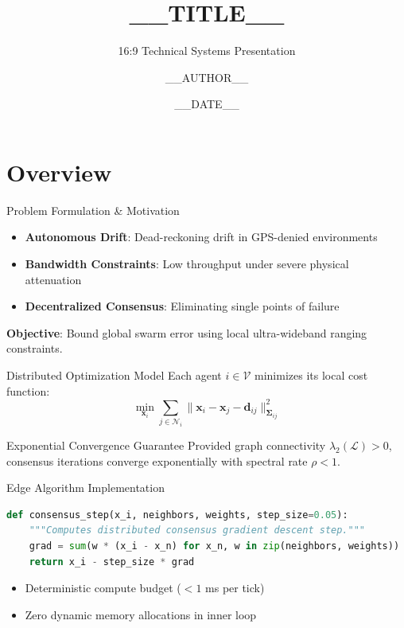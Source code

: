 \documentclass[aspectratio=169, 11pt]{beamer}
\title{\textbf{__TITLE__}}
\subtitle{16:9 Technical Systems Presentation}
\author{__AUTHOR__}
\institute{__DEPENDENCY__}
\date{__DATE__}
\begin{document}
\begin{frame}[plain]
    \titlepage
\end{frame}

\section{Overview}

\begin{frame}{Problem Formulation \& Motivation}
    \begin{itemize}
        \item \textbf{Autonomous Drift}: Dead-reckoning drift in GPS-denied environments
        \item \textbf{Bandwidth Constraints}: Low throughput under severe physical attenuation
        \item \textbf{Decentralized Consensus}: Eliminating single points of failure
    \end{itemize}
    
    \vspace{0.8em}
    \begin{tcolorbox}[arc=3mm]
        \textbf{Objective}: Bound global swarm error using local ultra-wideband ranging constraints.
    \end{tcolorbox}
\end{frame}

\begin{frame}{Distributed Optimization Model}
    Each agent $i \in \mathcal{V}$ minimizes its local cost function:
    \begin{equation}
        \min_{\mathbf{x}_i} \sum_{j \in \mathcal{N}_i} \|\mathbf{x}_i - \mathbf{x}_j - \mathbf{d}_{ij}\|_{\mathbf{\Sigma}_{ij}}^2
    \end{equation}

    \begin{block}{Exponential Convergence Guarantee}
        Provided graph connectivity $\lambda_2(\mathcal{L}) > 0$, consensus iterations converge exponentially with spectral rate $\rho < 1$.
    \end{block}
\end{frame}

\begin{frame}[fragile]{Edge Algorithm Implementation}
\begin{lstlisting}[language=Python]
def consensus_step(x_i, neighbors, weights, step_size=0.05):
    """Computes distributed consensus gradient descent step."""
    grad = sum(w * (x_i - x_n) for x_n, w in zip(neighbors, weights))
    return x_i - step_size * grad
\end{lstlisting}

    \begin{itemize}
        \item Deterministic compute budget ($< 1$ ms per tick)
        \item Zero dynamic memory allocations in inner loop
    \end{itemize}
\end{frame}
\end{document}
